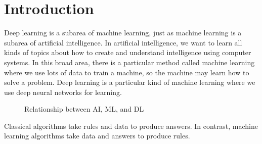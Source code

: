 \chapter{Introduction}
Deep learning is a subarea of machine learning, just as machine learning is a subarea of artificial intelligence. In artificial intelligence, 
we want to learn all kinds of topics about how to create and understand intelligence using computer systems. In this broad area, there is a particular 
method called machine learning where we use lots of data to train a machine, so the machine may learn how to solve a problem. Deep learning is a particular
kind of machine learning where we use deep neural networks for learning. \\
\begin{figure}[h!]
    \centering
    \caption{Relationship between AI, ML, and DL}
\end{figure}

Classical algorithms take rules and data to produce answers. In contrast, machine learning algorithms take data and answers to produce rules.